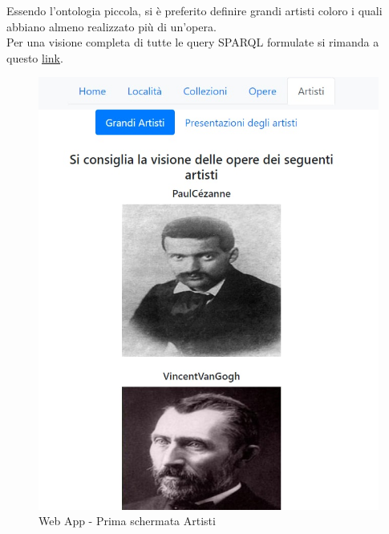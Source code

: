 \documentclass[12pt]{article}
\begin{document}
Essendo l’ontologia piccola, si è preferito definire grandi artisti coloro i quali abbiano almeno realizzato più di un’opera.\\
Per una visione completa di tutte le query SPARQL formulate si rimanda a questo \href{https://github.com/ModSem20-21/MuseumOntology/blob/master/Query%20SPARQL/Query%20SPARQL.pdf}{link}.

\begin{figure}[!p]
   \centering
   \includegraphics[scale=0.5]{fig/Schermata 5.1 webapp.jpeg}
   \caption{Web App - Prima schermata Artisti}\label{fig:picture}

\end{figure}
\end{document}
